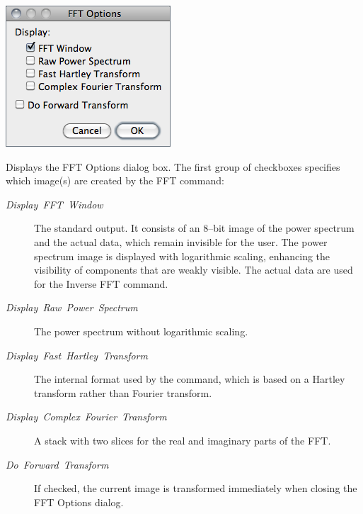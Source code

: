 \begin{minipage}[c][1\totalheight][t]{0.34\columnwidth}%
\includegraphics[scale=0.55]{images/FFToptions}%
\end{minipage}%
\begin{minipage}[c][1\totalheight][t]{0.66\columnwidth}%
Displays the FFT Options dialog box. The first group of checkboxes
specifies which image(s) are created by the FFT command: 
\begin{description}
\item [{\emph{Display\ FFT\ Window}}] The standard output. It consists
of an 8--bit image of the power spectrum and the actual data, which
remain invisible for the user. The power spectrum image is displayed
with logarithmic scaling, enhancing the visibility of components that
are weakly visible. The actual data are used for the Inverse FFT command. \end{description}
%
\end{minipage}
\begin{description}
\item [{\emph{Display\ Raw}\ \emph{Power}\ \emph{Spectrum}}] The power
spectrum without logarithmic scaling. 
\item [{\emph{Display\ Fast\ Hartley\ Transform}}] The internal format
used by the command, which is based on a Hartley transform rather
than Fourier transform. 
\item [{\emph{Display\ Complex}\ \emph{Fourier}\ \emph{Transform}}] A
stack with two slices for the real and imaginary parts of the FFT. 
\item [{\emph{Do}\ \emph{Forward}\ \emph{Transform}}] If checked, the
current image is transformed immediately when closing the FFT Options
dialog.
\end{description}

\subsubsection{\protect{}\label{sub:Bandpass-Filter...}}


